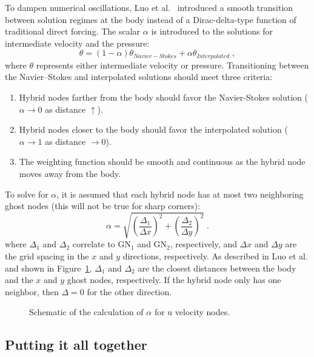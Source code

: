 \documentclass[onehalf,11pt]{beavtex}
\begin{document}
To dampen numerical oscillations, Luo et al.~\cite{Luo:2012gx} introduced a smooth transition between solution regimes at the body instead of a Dirac-delta-type function of traditional direct forcing.
The scalar $\alpha$ is introduced to the solutions for intermediate velocity and the pressure:
\begin{equation}\label{eq:Weight}
\theta = \left(1-\alpha \right)\theta_{Navier-Stokes} + \alpha \theta_{Interpolated} \;,
\end{equation}
where $\theta$ represents either intermediate velocity or pressure.
Transitioning between the Navier--Stokes and interpolated solutions should meet three criteria:
\begin{enumerate}
	\item Hybrid nodes farther from the body should favor the Navier-Stokes solution ($\alpha \rightarrow 0$ as distance $\uparrow$).
	\item Hybrid nodes closer to the body should favor the interpolated solution ($\alpha \rightarrow 1$ as distance $ \rightarrow 0$).
	\item The weighting function should be smooth and continuous as the hybrid node moves away from the body.
\end{enumerate}
To solve for $\alpha$, it is assumed that each hybrid node has at most two neighboring ghost nodes (this will not be true for sharp corners):
\begin{equation}
\alpha = \sqrt{\left(\frac{\Delta_1}{\Delta x}\right)^2 + \left(\frac{\Delta_2}{\Delta y}\right)^2} \;.
\label{eq:Alpha}
\end{equation}
where $\Delta_1$ and $\Delta_2$ correlate to GN$_1$ and GN$_2$, respectively, and $\Delta x$ and $\Delta y$ are the grid spacing in the $x$ and $y$ directions, respectively.
As described in Luo et al. and shown in Figure~\ref{fig:Weight}, $\Delta_1$ and $\Delta_2$ are the closest distances between the body and the $x$ and $y$ ghost nodes, respectively.
If the hybrid node only has one neighbor, then $\Delta=0$ for the other direction.
\begin{figure}[htb]
	\centering
	
	\caption{Schematic of the calculation of $\alpha$ for u velocity nodes.}
	\label{fig:Weight}
\end{figure}

\subsection{Putting it all together}
\label{putting it all together}
\end{document}
